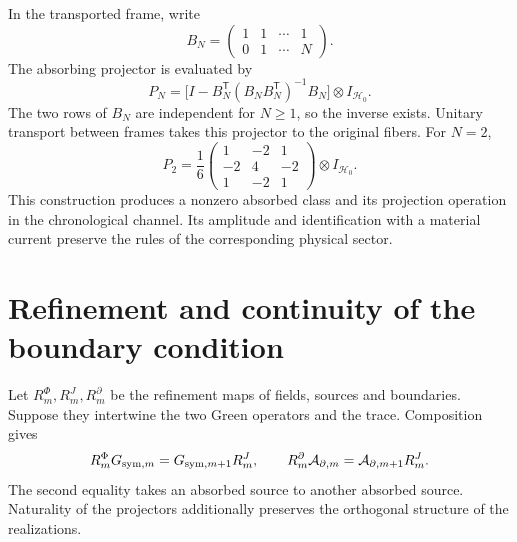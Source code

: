 In the transported frame, write
\[
 B_N=\begin{pmatrix}1&1&\cdots&1\\0&1&\cdots&N\end{pmatrix}.
\]
The absorbing projector is evaluated by
\begin{equation}
 P_N=\bigl[I-B_N^{\mathsf T}(B_NB_N^{\mathsf T})^{-1}B_N\bigr]
       \otimes I_{\mathcal H_0}.
 \label{x_reciprocidad:vii:eq:proyector-momentos-cronologicos}
\end{equation}
The two rows of \(B_N\) are independent for \(N\geq1\), so
the inverse exists. Unitary transport between frames takes this
projector to the original fibers. For \(N=2\),
\[
 P_2=\frac16
 \begin{pmatrix}1&-2&1\\-2&4&-2\\1&-2&1\end{pmatrix}
 \otimes I_{\mathcal H_0}.
\]
This construction produces a nonzero absorbed class and its projection
operation in the chronological channel. Its amplitude and identification with a
material current preserve the rules of the corresponding physical sector.

\section{Refinement and continuity of the boundary condition}
\label{x_reciprocidad:vii:subsec:refinamiento-absorcion}

Let \(R_m^\Phi,R_m^J,R_m^\partial\) be the refinement maps of
fields, sources and boundaries. Suppose they intertwine the two Green operators and the
trace. Composition gives
\begin{equation}
 R_m^\Phi G_{{\rm sym},m}=G_{{\rm sym},m+1}R_m^J,\qquad
 R_m^\partial\mathcal A_{\partial,m}
 =\mathcal A_{\partial,m+1}R_m^J.
 \label{x_reciprocidad:vii:eq:refinamiento-lectura-absorcion}
\end{equation}
The second equality takes an absorbed source to another absorbed source.
Naturality of the projectors additionally preserves the orthogonal
structure of the realizations.

